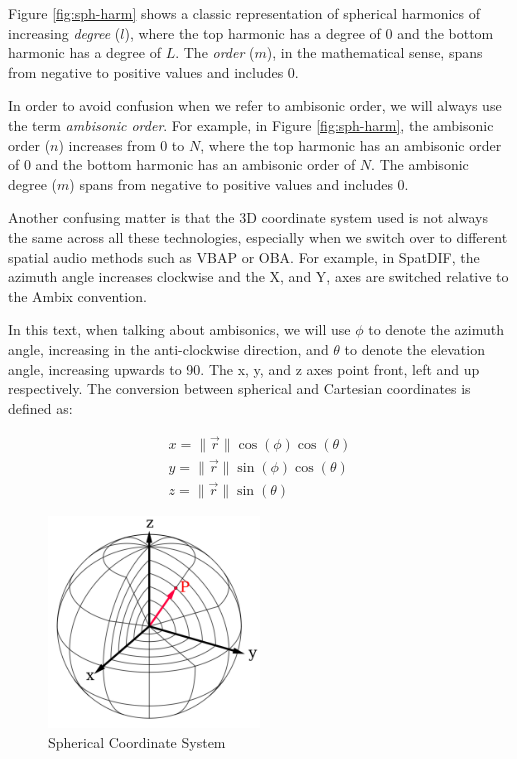 Figure \ref{fig:sph-harm} shows a classic representation of spherical harmonics of increasing \textit{degree} ($l$), where the top harmonic has a degree of 0 and the bottom harmonic has a degree of $L$. The \textit{order} ($m$), in the mathematical sense, spans from negative to positive values and includes 0. 

In order to avoid confusion when we refer to ambisonic order, we will always use the term \textit{ambisonic order}. For example, in Figure \ref{fig:sph-harm}, the ambisonic order ($n$) increases from 0 to $N$, where the top harmonic has an ambisonic order of 0 and the bottom harmonic has an ambisonic order of $N$. The ambisonic degree ($m$) spans from negative to positive values and includes 0. 

Another confusing matter is that the 3D coordinate system used is not always the same across all these technologies, especially when we switch over to different spatial audio methods such as VBAP or OBA. For example, in SpatDIF, the azimuth angle increases clockwise and the X, and Y, axes are switched relative to the Ambix convention. 

In this text, when talking about ambisonics, we will use $\phi$ to denote the azimuth angle, increasing in the anti-clockwise direction, and $\theta$ to denote the elevation angle, increasing upwards to 90\textdegree. The x, y, and z axes point front, left and up respectively. The conversion between spherical and Cartesian coordinates is defined as: 

\begin{equation}
\begin{array}{l}
x=\|\vec{r}\| \cos (\phi) \cos (\theta) \\
y=\|\vec{r}\| \sin (\phi) \cos (\theta) \\
z=\|\vec{r}\| \sin (\theta)
\end{array}
\end{equation}


\begin{figure}[ht!]%
\centering
\includegraphics[width=0.5\textwidth]{img/sph-coord.png}
\caption{Spherical Coordinate System \cite{Spherica11online}}
\label{fig:sph-coord}
\end{figure}


